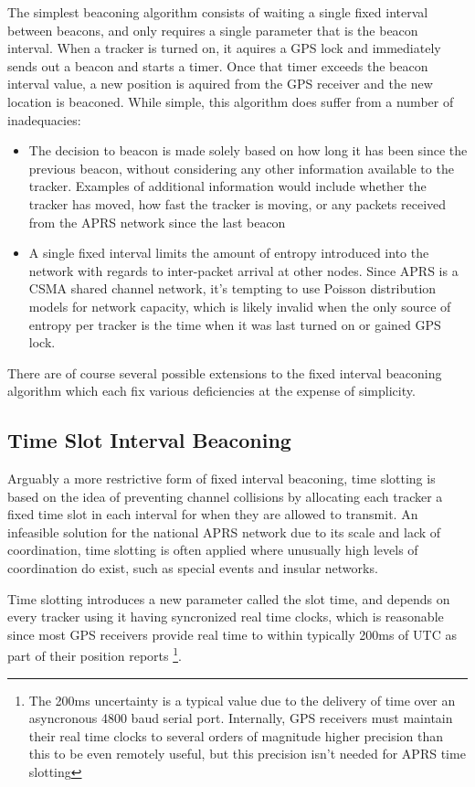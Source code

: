 The simplest beaconing algorithm consists of waiting a single fixed interval
between beacons, and only requires a single parameter that is the beacon interval.
When a tracker is turned on, it aquires a GPS lock and immediately sends out a 
beacon and starts a timer. Once that timer exceeds the beacon interval value, a 
new position is aquired from the GPS receiver and the new location is beaconed.
While simple, this algorithm does suffer from a number of inadequacies:
\begin{itemize}
\item The decision to beacon is made solely based on how long it has been
since the previous beacon, without considering any other information available
to the tracker. Examples of additional information would include whether the 
tracker has moved, how fast the tracker is moving, or any packets received from
the APRS network since the last beacon
\item A single fixed interval limits the amount of entropy introduced into the
network with regards to inter-packet arrival at other nodes. Since APRS is a 
CSMA shared channel network, it's tempting to use Poisson distribution models
for network capacity, which is likely invalid when the only source of entropy 
per tracker is the time when it was last turned on or gained GPS lock.
\end{itemize}

There are of course several possible extensions to the fixed interval beaconing
algorithm which each fix various deficiencies at the expense of simplicity.

\subsection{Time Slot Interval Beaconing}

Arguably a more restrictive form of fixed interval beaconing, time slotting is 
based on the idea of preventing channel collisions by allocating each tracker
a fixed time slot in each interval for when they are allowed to transmit.
An infeasible solution for the national APRS network due to its scale and lack
of coordination, time slotting is often applied where unusually high levels of
coordination do exist, such as special events and insular networks.

Time slotting introduces a new parameter called the slot time, and depends on every
tracker using it having syncronized real time clocks, which is reasonable since most
GPS receivers provide real time to within typically 200ms of UTC 
as part of their position reports
\footnote{The 200ms uncertainty is a typical value due to the delivery of time over
an asyncronous 4800 baud serial port. Internally, GPS receivers must maintain 
their real time clocks to several orders of magnitude higher precision than this
to be even remotely useful, but this precision isn't needed for APRS time slotting}.

